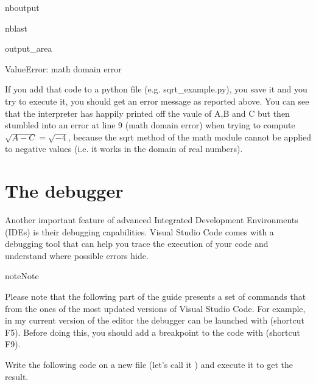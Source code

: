 \documentclass[letterpaper,10pt,english]{sphinxmanual}
\begin{document}
\begin{sphinxuseclass}{nboutput}
\begin{sphinxuseclass}{nblast}
{\begin{sphinxuseclass}{output_area}
\begin{sphinxuseclass}{}
\begin{sphinxVerbatim}[commandchars=\\\{\}]
\textcolor{ansi-red}{ValueError}: math domain error
\end{sphinxVerbatim}



\end{sphinxuseclass}
\end{sphinxuseclass}
}

\end{sphinxuseclass}
\end{sphinxuseclass}
\sphinxAtStartPar
If you add that code to a python file (e.g. sqrt\_example.py), you save it and you try to execute it, you should get an error message as reported above. You can see that the interpreter has happily printed off the vaule of A,B and C but then stumbled into an error at line 9 (math domain error) when trying to compute \(\sqrt{A-C} = \sqrt{-4}\), because the sqrt method of the math module cannot be applied to negative values (i.e. it works in the domain of real numbers).

\sphinxAtStartPar
{}


\section{The debugger}
\label{\detokenize{M1_practical1:The-debugger}}
\sphinxAtStartPar
Another important feature of advanced Integrated Development Environments (IDEs) is their debugging capabilities. Visual Studio Code comes with a debugging tool that can help you trace the execution of your code and understand where possible errors hide.

\begin{sphinxadmonition}{note}{Note}\par
\sphinxAtStartPar
Please note that the following part of the guide presents a set of commands that  from the ones of the most updated versions of Visual Studio Code. For example, in my current version of the editor the debugger can be launched with  (shortcut F5). Before doing this, you should add a breakpoint to the code with  (shortcut F9).
\end{sphinxadmonition}

\sphinxAtStartPar
Write the following code on a new file (let’s call it ) and execute it to get the result.
\end{document}
